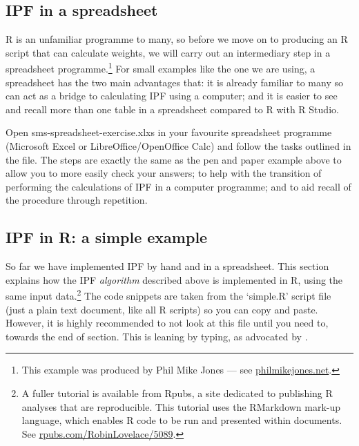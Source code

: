 \documentclass[a4paper, 11pt, twoside]{article}
\begin{document}

\subsection{IPF in a spreadsheet}
R is an unfamiliar programme to many, so before we move on to producing an R script that can calculate weights, we will carry out an intermediary step in a spreadsheet programme.\footnote{This
example was produced by Phil Mike Jones --- see \href{http://www.philmikejones.net/}{philmikejones.net}.}
For small examples like the one we are using, a spreadsheet has the two main advantages that: it is already familiar to many so can act as a bridge to calculating IPF using a computer; and it is easier to see and recall more than one table in a spreadsheet compared to R with R Studio.

Open sms-spreadsheet-exercise.xlxs in your favourite spreadsheet programme (Microsoft Excel or LibreOffice/OpenOffice Calc) and follow the tasks outlined in the file. The steps are exactly the same as the pen and paper example above to allow you to more easily check your answers; to help with the transition of performing the calculations of IPF in a computer programme; and to aid recall of the procedure through repetition.


\subsection{IPF in R: a simple example} \label{simplementing}
So far we have implemented IPF by hand and in a spreadsheet.
This section explains how the IPF
\emph{algorithm} described above is implemented in R, using the
same input data.\footnote{A fuller tutorial is available from Rpubs, a site dedicated
to publishing R analyses that are reproducible. This tutorial uses the RMarkdown
mark-up language, which enables R code to be run and presented within
documents. See \href{http://rpubs.com/RobinLovelace/5089}{rpubs.com/RobinLovelace/5089}\label{fnrpub}.}
The code snippets are taken from the `simple.R' script file (just a plain text
document, like all R scripts) so you can copy and paste. However, it is
highly recommended to not look at this file until you need to, towards
the end of
section. This is leaning by typing, as advocated by \citet{shaw2013learn}.
\end{document}
